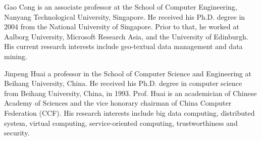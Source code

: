 \documentclass[10pt,journal,compsoc,twoside]{IEEEtran}
\newcommand{\eat}[1]{}
\begin{document}
\vspace{-6ex}
\begin{IEEEbiography}{Gao Cong} is an associate professor at the School of Computer Engineering, Nanyang Technological University, Singapore. He received his Ph.D. degree in 2004 from the National University of Singapore. Prior to that, he worked at Aalborg University, Microsoft Research Asia, and the University of Edinburgh. His current research interests include geo-textual data management and data mining.
\end{IEEEbiography}
\vspace{-6ex}
\begin{IEEEbiography}{Jinpeng Huai} a professor in the School of Computer Science and Engineering at Beihang University, China. He received his Ph.D. degree in computer science from Beihang University, China, in 1993. Prof. Huai is an academician of Chinese Academy of Sciences and the vice honorary chairman of China Computer Federation (CCF). His research interests include big data computing, distributed system, virtual computing, service-oriented computing, trustworthiness and security.
\end{IEEEbiography}

\vfill

%

%

\eat{%

\begin{IEEEbiography}{Michael Shell}
Biography text here.
\end{IEEEbiography}

\begin{IEEEbiographynophoto}{John Doe}
Biography text here.
\end{IEEEbiographynophoto}


\begin{IEEEbiographynophoto}{Jane Doe}
Biography text here.
\end{IEEEbiographynophoto}

}%
\end{document}
